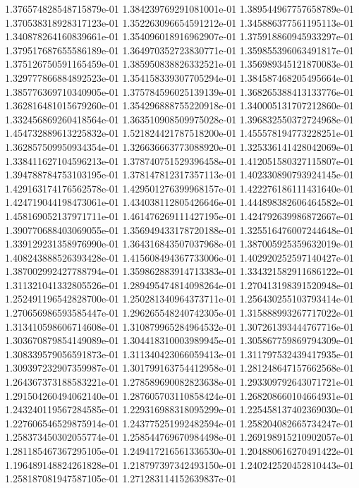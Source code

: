 1.376574828548715879e-01
1.384239769291081001e-01
1.389544967757658789e-01
1.370538318928317123e-01
1.352263096654591212e-01
1.345886377561195113e-01
1.340878264160839661e-01
1.354096018916962907e-01
1.375918860945933297e-01
1.379517687655586189e-01
1.364970352723830771e-01
1.359855396063491817e-01
1.375126750591165459e-01
1.385950838826332521e-01
1.356989345121870083e-01
1.329777866884892523e-01
1.354158339307705294e-01
1.384587468205495664e-01
1.385776369710340905e-01
1.375784596025139139e-01
1.368265388413133776e-01
1.362816481015679260e-01
1.354296888755220918e-01
1.340005131707212860e-01
1.332456869260418564e-01
1.363510908509975028e-01
1.396832550372724968e-01
1.454732889613225832e-01
1.521824421787518200e-01
1.455578194773228251e-01
1.362857509950934354e-01
1.326636663773088920e-01
1.325336141428042069e-01
1.338411627104596213e-01
1.378740751529396458e-01
1.412051580327115807e-01
1.394788784753103195e-01
1.378147812317357113e-01
1.402330890793924145e-01
1.429163174176562578e-01
1.429501276399968157e-01
1.422276186111431640e-01
1.424719044198473061e-01
1.434038112805426646e-01
1.444898382606464582e-01
1.458169052137971711e-01
1.461476269111427195e-01
1.424792639986872667e-01
1.390770688403069055e-01
1.356949433178720188e-01
1.325516476007244648e-01
1.339129231358976990e-01
1.364316843507037968e-01
1.387005925359632019e-01
1.408243888526393428e-01
1.415608494367733006e-01
1.402920252597140427e-01
1.387002992427788794e-01
1.359862883914713383e-01
1.334321582911686122e-01
1.311321041332805526e-01
1.289495474814098264e-01
1.270413198391520948e-01
1.252491196542828700e-01
1.250281340964373711e-01
1.256430255103793414e-01
1.270656986593585447e-01
1.296265548240742305e-01
1.315888993267717022e-01
1.313410598606714608e-01
1.310879965284964532e-01
1.307261393444767716e-01
1.303670879854149089e-01
1.304418310003989945e-01
1.305867759869794309e-01
1.308339579056591873e-01
1.311340423066059413e-01
1.311797532439417935e-01
1.309397232907359987e-01
1.301799163754412958e-01
1.281248647157662568e-01
1.264367373188583221e-01
1.278589690082823638e-01
1.293309792643071721e-01
1.291504260494062140e-01
1.287605703110858424e-01
1.268208660104664931e-01
1.243240119567284585e-01
1.229316988318095299e-01
1.225458137402369030e-01
1.227606546529875914e-01
1.243775251992482594e-01
1.258204082665734247e-01
1.258373450302055774e-01
1.258544769670984498e-01
1.269198915210902057e-01
1.281185467367295105e-01
1.249417216561336530e-01
1.204880616270491422e-01
1.196489148824261828e-01
1.218797397342493150e-01
1.240242520452810443e-01
1.258187081947587105e-01
1.271283114152639837e-01
